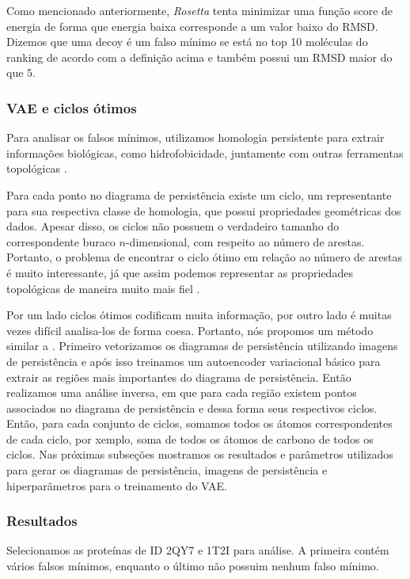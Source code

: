Como mencionado anteriormente, \textit{Rosetta} tenta minimizar uma função score de energia de forma
que energia baixa corresponde a um valor baixo do RMSD. Dizemos que uma decoy é um falso mínimo
se está no top 10 moléculas do ranking de acordo com a definição acima e também possui um RMSD maior
do que $5$.

\subsubsection{VAE e ciclos ótimos}

Para analisar os falsos mínimos, utilizamos homologia persistente \cite{Edelsbrunner2002} para extrair
informações biológicas, como hidrofobicidade, juntamente com outras ferramentas topológicas \cite{Cang2017}.

Para cada ponto no diagrama de persistência existe um ciclo, um representante para sua respectiva classe
de homologia, que possui propriedades geométricas dos dados. Apesar disso, os ciclos não possuem o
verdadeiro tamanho do correspondente buraco $n$-dimensional, com respeito ao número de arestas. Portanto,
o problema de encontrar o ciclo ótimo em relação ao número de arestas é muito interessante, já que assim
podemos representar as propriedades topológicas de maneira muito mais fiel \cite{Escolar2015}.

Por um lado ciclos ótimos codificam muita informação, por outro lado é muitas vezes difícil analisa-los
de forma coesa. Portanto, nós propomos um método similar a \cite{Obayashi2018}. Primeiro vetorizamos
os diagramas de persistência utilizando imagens de persistência \cite{Adams2017} e após isso treinamos
um autoencoder variacional básico \cite{kingma2013} para extrair as regiões mais importantes
do diagrama de persistência. Então realizamos uma análise inversa, em que para
cada região existem pontos associados no diagrama de persistência e dessa forma seus
respectivos ciclos. Então, para cada conjunto de ciclos, somamos todos os átomos correspondentes de
cada ciclo, por xemplo, soma de todos os átomos de carbono de todos os ciclos. Nas próximas subseções
mostramos os resultados e parâmetros utilizados para gerar os diagramas de persistência, imagens
de persistência e hiperparâmetros para o treinamento do VAE.

\subsubsection{Resultados}

Selecionamos as proteínas de ID 2QY7 e 1T2I para análise. A primeira contém vários falsos mínimos,
enquanto o último não possuim nenhum falso mínimo.

